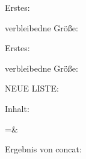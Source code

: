 \documentclass[a4paper]{article}
\begin{document}
{\listpopfront\probe\to\first
Erstes: \first

verbleibedne Größe: \listsize\probe{}\the{}

\listpopfront\probe\to\first
Erstes: \first

verbleibedne Größe: \listsize\probe{}\the{}


%
NEUE LISTE:
\listnew{}
\listnew{}
{\def\\#1{#1\par}
Inhalt: 

\foolist
}

\listconcat\third=\foolist&\foolistX

{\def\\#1{#1\par}
Ergebnis von concat: 

\third
}
%
}



% 
\end{document}
